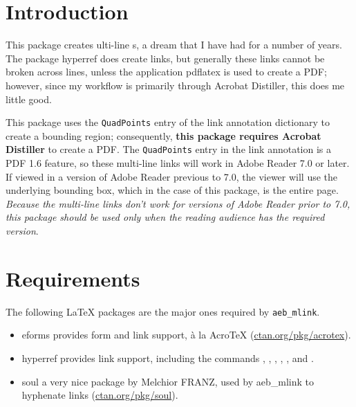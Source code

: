 \documentclass{article}
\let\pkg\textsf
\let\app\textsf
\begin{document}
\maketitle


\tableofcontents


\section{Introduction}

This package creates ulti-line s, a dream
that I have had for a number of years. The package \pkg{hyperref}
does create links, but generally these links cannot be broken across
lines, unless the application \app{pdflatex} is used to create a
PDF; however, since my workflow is primarily through \app{Acrobat
Distiller}, this does me little good.

This package uses the \texttt{QuadPoints} entry of the link
annotation dictionary to create a bounding region; consequently,
\textbf{this package requires \app{Acrobat Distiller}} to create a PDF. The
\texttt{QuadPoints} entry in the link annotation is a PDF 1.6
feature, so these multi-line links will work in Adobe Reader 7.0 or
later. If viewed in a version of Adobe Reader previous to 7.0, the
viewer will use the underlying bounding box, which in the case of
this package, is the entire page. \emph{Because the multi-line links don't
work for versions of Adobe Reader prior to 7.0, this package should
be used only when the reading audience has the required version}.


\section{Requirements}

The following {\LaTeX} packages are the major ones required by \texttt{aeb\_mlink}.
\begin{itemize}
    \item \pkg{eforms} provides form and link support, \`a la
        {Acro\negthinspace\TeX} (\url{ctan.org/pkg/acrotex}).
    \item \pkg{hyperref} provides link support, including the
        commands , , , ,
        , and .
    \item \pkg{soul} a very nice package by Melchior FRANZ, used by
        \pkg{aeb\_mlink} to hyphenate links (\url{ctan.org/pkg/soul}).

\end{itemize}
\end{document}
